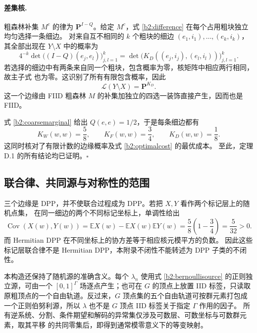 \documentclass[UTF8,zihao=-4,a4paper]{ctexart}
\numberwithin{equation}{section}
\newcommand{\EE}{\mathbb E}
\begin{document}
\paragraph{差集核.}
粗森林补集 $M^c$ 的律为 $\mathbf P^{I-Q}$。给定 $M^c$，式
\eqref{b2:difference} 在每个占用粗块独立均匀选择一条细边。
对来自互不相同的 $k$ 个粗块的细边 $(e_1,i_1),\ldots,(e_k,i_k)$，其全部出现在
$Y\setminus X$ 中的概率为
\begin{equation}\label{b2:dppdifference}
 4^{-k}\det\bigl((I-Q)(e_j,e_l)\bigr)_{j,l=1}^k
 =\det\bigl(K_D((e_j,i_j),(e_l,i_l))\bigr)_{j,l=1}^k.
\end{equation}
若选择的细边中有两条来自同一个粗块，包含概率为零，核矩阵中相应两行相同，故主子式
也为零。这识别了所有有限包含概率，因此
\begin{equation}\label{b2:diffkernel}
 \mathcal L(Y\setminus X)=\mathbf P^{K_D}.
\end{equation}
这一个边缘由 FIID 粗森林 $M$ 的补集加独立的四选一装饰直接产生，因而也是 FIID。

式 \eqref{b2:coarsemarginal} 给出 $Q(e,e)=1/2$，于是每条细边都有
\begin{equation}\label{b2:diagonals}
 K_W(w,w)=\frac58,\qquad K_F(w,w)=\frac34,\qquad K_D(w,w)=\frac18.
\end{equation}
这同时核对了有限计数的边缘概率及式 \eqref{b2:optimalcost} 的最优成本。
至此，定理 D.1 的所有结论均已证明。\hfill$\square$

\subsection{联合律、共同源与对称性的范围}\label{b2:scope}

三个边缘是 DPP，并不使联合过程成为 DPP。若把 $X,Y$ 看作两个标记层上的随机点集，
在同一细边的两个不同标记坐标上，单调性给出
\[
 \operatorname{Cov}(X(w),Y(w))
 =\EE X(w)-\EE X(w)\EE Y(w)
 =\frac58\left(1-\frac34\right)=\frac5{32}>0.
\]
而 Hermitian DPP 在不同坐标上的协方差等于相应核元模平方的负数。
因此这些标记层联合律不是 Hermitian DPP，本附录不闭性不能转述为 DPP 子类的不闭性。

本构造还保持了随机源的准确含义。每个 $\lambda_n$ 使用式 \eqref{b2:bernoullisource}
的正则独立源，可由一个 $[0,1]^\Gamma$ 场逐点产生；也可在 $G$ 的顶点上放置 IID
标签，只读取原粗顶点的一个自由轨道。反过来，$G$ 顶点集的五个自由轨道可按群元素打包成
一个正则伯努利源，所以 $\lambda$ 也不是 $G$ 顶点 IID 标签关于指定 $\Gamma$ 作用的因子。
所有逆系统、分割、条件期望和解码的异常集仅涉及可数层、可数坐标与可数群元素，取其平移
的共同零集后，即得到通常模零意义下的等变映射。
\end{document}
